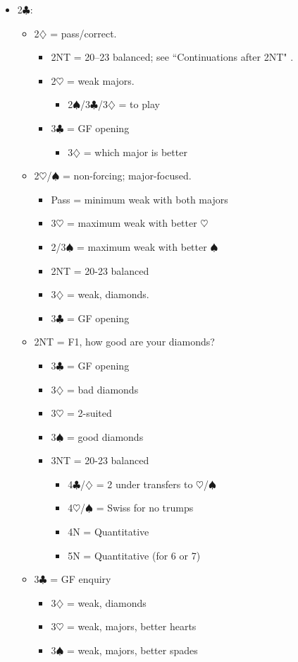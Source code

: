 \documentclass[a4paper,14pt]{extarticle}
\begin{document}
\begin{itemize}
\item 2$\clubsuit$:
	\begin{itemize}
   \item 2$\diamondsuit$ = pass/correct.
		\begin{itemize}
      \item 2NT = 20--23 balanced; see ``Continuations after 2NT" .
      \item 2$\heartsuit$ = weak majors.
			\begin{itemize}
			\item 2$\spadesuit$/3$\clubsuit$/3$\diamondsuit$ = to play
			\end{itemize}
		\item 3$\clubsuit$ = GF opening
			\begin{itemize}
			\item 3$\diamondsuit$ = which major is better
			\end{itemize}
		\end{itemize}
   \item 2$\heartsuit$/$\spadesuit$ = non-forcing; major-focused.
		\begin{itemize}
		\item Pass = minimum weak with both majors
		\item 3$\heartsuit$ = maximum weak with better $\heartsuit$
		\item 2/3$\spadesuit$ = maximum weak with better $\spadesuit$
		\item 2NT = 20-23 balanced
		\item 3$\diamondsuit$ = weak, diamonds.
		\item 3$\clubsuit$ = GF opening
		\end{itemize}
	\item 2NT = F1, how good are your diamonds?
		\begin{itemize}
		\item 3$\clubsuit$ = GF opening
 		\item 3$\diamondsuit$ = bad diamonds
		\item 3$\heartsuit$ = 2-suited
		\item 3$\spadesuit$ = good diamonds
		\item 3NT = 20-23 balanced
			\begin{itemize}
         \item 4$\clubsuit$/$\diamondsuit$ = 2 under transfers to $\heartsuit$/$\spadesuit$
         \item 4$\heartsuit$/$\spadesuit$ = Swiss for no trumps 
         \item 4N = Quantitative
         \item 5N = Quantitative (for 6 or 7)
			\end{itemize}
		\end{itemize}
	\item 3$\clubsuit$ = GF enquiry
		\begin{itemize}
		\item 3$\diamondsuit$ = weak, diamonds
		\item 3$\heartsuit$ = weak, majors, better hearts
		\item 3$\spadesuit$ = weak, majors, better spades
		\end{itemize}


\end{itemize}
\end{itemize}
\end{document}
